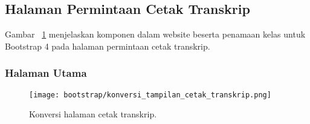 \subsection{Halaman Permintaan Cetak Transkrip}
\noindent Gambar ~\ref{fig:konversiPermintaanCetakTranskrip} menjelaskan komponen dalam website beserta penamaan kelas untuk Bootstrap 4 pada halaman permintaan cetak transkrip.\\

\subsubsection{Halaman Utama}
\begin{figure} [H]
	\centering  
	\texttt{[image: bootstrap/konversi\_tampilan\_cetak\_transkrip.png]}
	\caption{Konversi halaman cetak transkrip.} 
	\label{fig:konversiPermintaanCetakTranskrip}
\end{figure}


